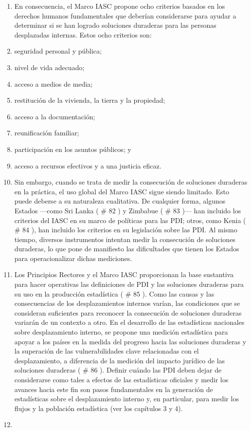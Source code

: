 \documentclass[
]{book}
\begin{document}
\begin{enumerate}
\item
  En consecuencia, el Marco IASC propone ocho criterios basados en los derechos humanos fundamentales que deberían considerarse para ayudar a determinar si se han logrado soluciones duraderas para las personas desplazadas internas. Estos ocho criterios son:
\item
  seguridad personal y pública;
\item
  nivel de vida adecuado;
\item
  acceso a medios de media;
\item
  restitución de la vivienda, la tierra y la propiedad;
\item
  acceso a la documentación;
\item
  reunificación familiar;
\item
  participación en los asuntos públicos; y
\item
  acceso a recursos efectivos y a una justicia eficaz.
\item
  Sin embargo, cuando se trata de medir la consecución de soluciones duraderas en la práctica, el uso global del Marco IASC sigue siendo limitado. Esto puede deberse a su naturaleza cualitativa. De cualquier forma, algunos Estados ---como Sri Lanka (
  \# 82
  ) y Zimbabue (
  \# 83
  )--- han incluido los criterios del IASC en su marco de políticas para las PDI; otros, como Kenia (
  \# 84
  ), han incluido los criterios en su legislación sobre las PDI. Al mismo tiempo, diversos instrumentos intentan medir la consecución de soluciones duraderas, lo que pone de manifiesto las dificultades que tienen los Estados para operacionalizar dichas mediciones.
\item
  Los Principios Rectores y el Marco IASC proporcionan la base sustantiva para hacer operativas las definiciones de PDI y las soluciones duraderas para su uso en la producción estadística (
  \# 85
  ). Como las causas y las consecuencias de los desplazamientos internos varían, las condiciones que se consideran suficientes para reconocer la consecución de soluciones duraderas variarán de un contexto a otro. En el desarrollo de las estadísticas nacionales sobre desplazamiento interno, se propone una medición estadística para apoyar a los países en la medida del progreso hacia las soluciones duraderas y la superación de las vulnerabilidades clave relacionadas con el desplazamiento, a diferencia de la medición del impacto jurídico de las soluciones duraderas (
  \# 86
  ). Definir cuándo las PDI deben dejar de considerarse como tales a efectos de las estadísticas oficiales y medir los avances hacia este fin son pasos fundamentales en la generación de estadísticas sobre el desplazamiento interno y, en particular, para medir los flujos y la población estadística (ver los capítulos 3 y 4).
\item ~
  \hypertarget{conclusiuxf3n}{%
}
\end{enumerate}
\end{document}
